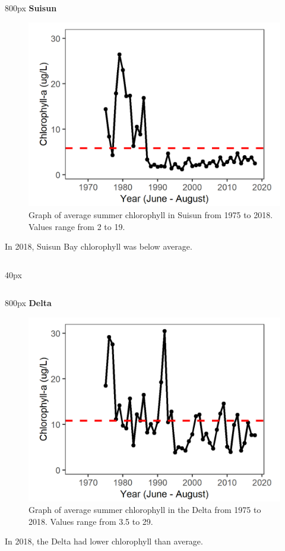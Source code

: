 \documentclass[
]{book}
\begin{document}
\begin{column}{800px\textwidth}
\textbf{Suisun}

\begin{figure}
\includegraphics[width=15.25in]{figures/chla_sssummer} \caption{Graph of average summer chlorophyll in Suisun from 1975 to 2018. Values range from 2 to 19.}\label{fig:unnamed-chunk-64}
\end{figure}

In 2018, Suisun Bay chlorophyll was below average.
\end{column}

\begin{column}{40px\textwidth}
~
\end{column}

\begin{column}{800px\textwidth}
\textbf{Delta}

\begin{figure}
\includegraphics[width=15.25in]{figures/chla_dtsummer} \caption{Graph of average summer chlorophyll in the Delta from 1975 to 2018. Values range from 3.5 to 29.}\label{fig:unnamed-chunk-65}
\end{figure}

In 2018, the Delta had lower chlorophyll than average.
\end{column}
\end{document}
